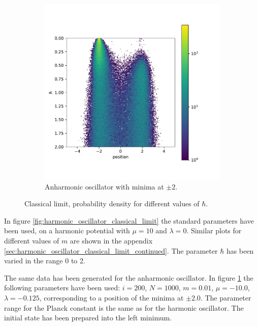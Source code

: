 \documentclass{scrartcl}
\begin{document}
\begin{figure}[H]
\begin{subfigure}[c]{0.49\textwidth}
				\includegraphics[width=\textwidth]{../imgs/anharmonic_oscillator_classical_limit/anharmonic_oscillator_classical_limit.pdf}
				\caption{Anharmonic oscillator with minima at $\pm2$.}
				\label{fig:anharmonic_oscillator_classical_limit}
			\end{subfigure}
			\caption{Classical limit, probability density for different values of $\hbar$.}
			\label{fig:classical_limits}
		\end{figure}
		In figure \ref{fig:harmonic_oscillator_classical_limit} the standard parameters have been used, on a harmonic potential  with $\mu = 10$ and $\lambda = 0$.
		Similar plots for different values of $m$ are shown in the appendix \ref{sec:harmonic_oscillator_classical_limit_continued}.
		The parameter $\hbar$ has been varied in the range 0 to 2.

		The same data has been generated for the anharmonic oscillator.
		In figure \ref{fig:anharmonic_oscillator_classical_limit} the following parameters have been used: $i = 200$, $N = 1000$, $m = 0.01$, $\mu = -10.0$, $\lambda = -0.125$, corresponding to a position of the minima at $\pm 2.0$.
		The parameter range for the Planck constant is the same as for the harmonic oscillator.
		The initial state has been prepared into the left minimum.
\end{document}
